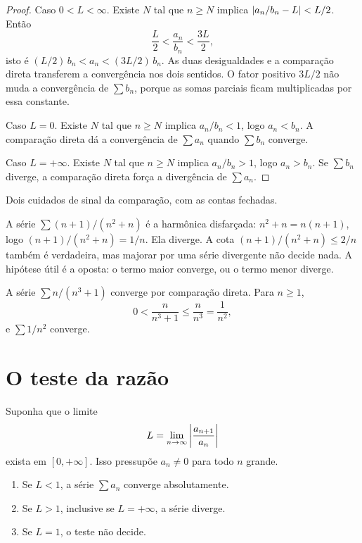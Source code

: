 \documentclass[11pt,a4paper]{article}
\begin{document}
\begin{proof}
Caso \(0<L<\infty\). Existe \(N\) tal que \(n\ge N\) implica \(\left\lvert a_n/b_n-L \right\rvert<L/2\). Então
\[
\frac{L}{2}<\frac{a_n}{b_n}<\frac{3L}{2},
\]
isto é \((L/2)\,b_n<a_n<(3L/2)\,b_n\). As duas desigualdades e a comparação direta transferem a convergência nos dois sentidos. O fator positivo \(3L/2\) não muda a convergência de \(\sum b_n\), porque as somas parciais ficam multiplicadas por essa constante.

Caso \(L=0\). Existe \(N\) tal que \(n\ge N\) implica \(a_n/b_n<1\), logo \(a_n<b_n\). A comparação direta dá a convergência de \(\sum a_n\) quando \(\sum b_n\) converge.

Caso \(L=+\infty\). Existe \(N\) tal que \(n\ge N\) implica \(a_n/b_n>1\), logo \(a_n>b_n\). Se \(\sum b_n\) diverge, a comparação direta força a divergência de \(\sum a_n\).
\end{proof}

\begin{exemplo}
Dois cuidados de sinal da comparação, com as contas fechadas.

A série \(\sum (n+1)/(n^2+n)\) é a harmônica disfarçada: \(n^2+n=n(n+1)\), logo \((n+1)/(n^2+n)=1/n\). Ela diverge. A cota \((n+1)/(n^2+n)\le 2/n\) também é verdadeira, mas majorar por uma série divergente não decide nada. A hipótese útil é a oposta: o termo maior converge, ou o termo menor diverge.

A série \(\sum n/(n^3+1)\) converge por comparação direta. Para \(n\ge 1\),
\[
0<\frac{n}{n^3+1}\le\frac{n}{n^3}=\frac{1}{n^2},
\]
e \(\sum 1/n^2\) converge.
\end{exemplo}

\section{O teste da razão}

\begin{teorema}
Suponha que o limite
\[
L=\lim_{n\to\infty}\left\lvert \frac{a_{n+1}}{a_n} \right\rvert
\]
exista em \([0,+\infty]\). Isso pressupõe \(a_n\neq 0\) para todo \(n\) grande.
\begin{enumerate}
\item Se \(L<1\), a série \(\sum a_n\) converge absolutamente.
\item Se \(L>1\), inclusive se \(L=+\infty\), a série diverge.
\item Se \(L=1\), o teste não decide.
\end{enumerate}
\end{teorema}
\end{document}
